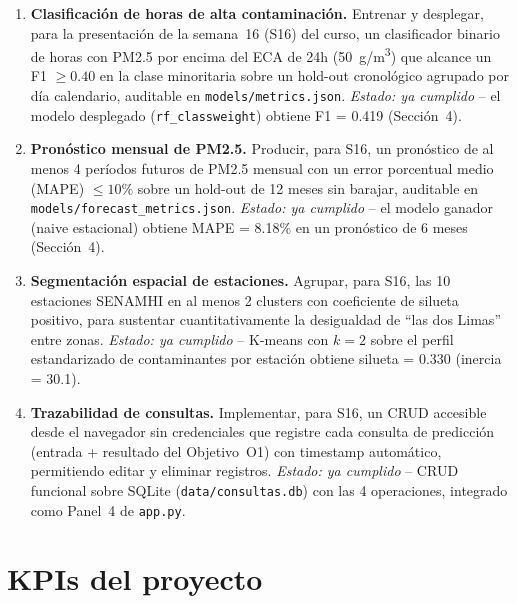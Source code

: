\documentclass[11pt,a4paper]{article}
\begin{document}
\begin{enumerate}[label=\textbf{O\arabic*.}, leftmargin=2.2em]

\item \textbf{Clasificación de horas de alta contaminación.} Entrenar y desplegar,
para la presentación de la semana~16 (S16) del curso, un clasificador binario de horas
con PM2.5 por encima del ECA de 24h (50~\textmu g/m\textsuperscript{3}) que alcance un
F1 $\geq 0.40$ en la clase minoritaria sobre un hold-out cronológico agrupado por día
calendario, auditable en \texttt{models/\allowbreak metrics.json}.
\emph{Estado: ya cumplido} -- el modelo desplegado (\texttt{rf\_classweight}) obtiene
F1 = 0.419 (Sección~4).

\item \textbf{Pronóstico mensual de PM2.5.} Producir, para S16, un pronóstico de al
menos 4 períodos futuros de PM2.5 mensual con un error porcentual medio (MAPE)
$\leq 10\%$ sobre un hold-out de 12 meses sin barajar, auditable en
\texttt{models/\allowbreak forecast\_metrics.json}.
\emph{Estado: ya cumplido} -- el modelo ganador (naive estacional) obtiene
MAPE = 8.18\% en un pronóstico de 6 meses (Sección~4).

\item \textbf{Segmentación espacial de estaciones.} Agrupar, para S16, las 10
estaciones SENAMHI en al menos 2 clusters con coeficiente de silueta positivo, para
sustentar cuantitativamente la desigualdad de ``las dos Limas'' entre zonas.
\emph{Estado: ya cumplido} -- K-means con $k=2$ sobre el perfil estandarizado de
contaminantes por estación obtiene silueta = 0.330 (inercia = 30.1).

\item \textbf{Trazabilidad de consultas.} Implementar, para S16, un CRUD accesible
desde el navegador sin credenciales que registre cada consulta de predicción (entrada +
resultado del Objetivo~O1) con timestamp automático, permitiendo editar y eliminar
registros.
\emph{Estado: ya cumplido} -- CRUD funcional sobre SQLite (\texttt{data/\allowbreak consultas.db})
con las 4 operaciones, integrado como Panel~4 de \texttt{app.py}.

\end{enumerate}

\section{KPIs del proyecto}
\end{document}
